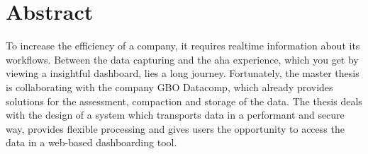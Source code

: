 \chapter*{Abstract}
\label{chap:abstract}

To increase the efficiency of a company, it requires realtime
information about its workflows. Between the data capturing
and the aha experience, which you get by viewing a 
insightful dashboard, lies a long journey. Fortunately,
the master thesis is collaborating with the company GBO Datacomp,
which already provides solutions for the assessment, compaction and
storage of the data. The thesis deals with the design of a system
which transports data in a performant and secure way, provides
flexible processing and gives users the opportunity to access
the data in a web-based dashboarding tool.


